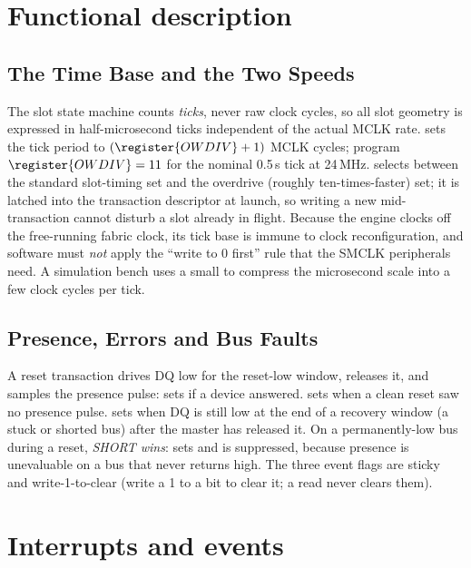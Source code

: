 \section{Functional description}

\subsection{The Time Base and the Two Speeds}

The slot state machine counts \emph{ticks}, never raw clock cycles, so all slot geometry is expressed in half-microsecond ticks independent of the actual MCLK rate.  sets the tick period to $(\register{OWDIV}+1)$ MCLK cycles; program $\register{OWDIV}=11$ for the nominal 0.5\,\textmu s tick at 24\,MHz.  selects between the standard slot-timing set and the overdrive (roughly ten-times-faster) set; it is latched into the transaction descriptor at launch, so writing a new  mid-transaction cannot disturb a slot already in flight. Because the engine clocks off the free-running fabric clock, its tick base is immune to clock reconfiguration, and software must \emph{not} apply the ``write  to 0 first'' rule that the SMCLK peripherals need. A simulation bench uses a small  to compress the microsecond scale into a few clock cycles per tick.

\subsection{Presence, Errors and Bus Faults}

A reset transaction drives DQ low for the reset-low window, releases it, and samples the presence pulse:  sets if a device answered.  sets when a clean reset saw no presence pulse.  sets when DQ is still low at the end of a recovery window (a stuck or shorted bus) after the master has released it. On a permanently-low bus during a reset, \emph{SHORT wins}:  sets and  is suppressed, because presence is unevaluable on a bus that never returns high. The three event flags are sticky and write-1-to-clear (write a 1 to a bit to clear it; a read never clears them).

\section{Interrupts and events}

